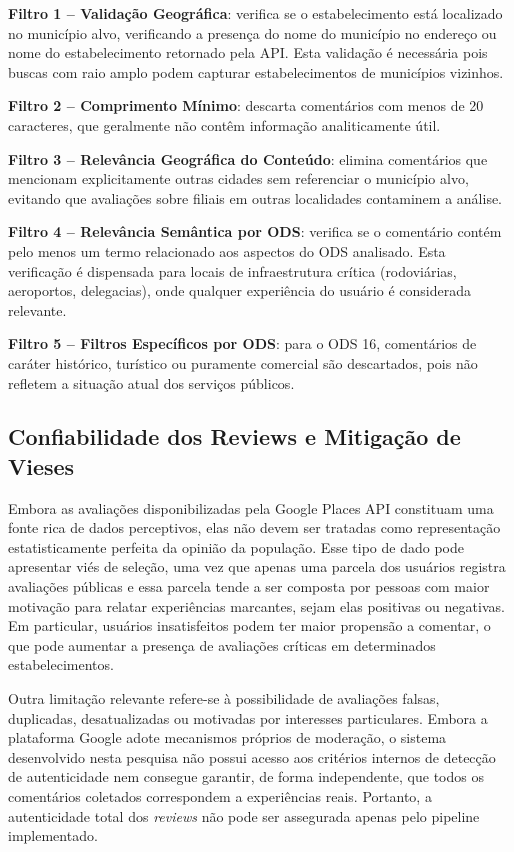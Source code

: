 \textbf{Filtro 1 -- Validação Geográfica}: verifica se o estabelecimento está localizado no município alvo, verificando a presença do nome do município no endereço ou nome do estabelecimento retornado pela API. Esta validação é necessária pois buscas com raio amplo podem capturar estabelecimentos de municípios vizinhos.

\textbf{Filtro 2 -- Comprimento Mínimo}: descarta comentários com menos de 20 caracteres, que geralmente não contêm informação analiticamente útil.

\textbf{Filtro 3 -- Relevância Geográfica do Conteúdo}: elimina comentários que mencionam explicitamente outras cidades sem referenciar o município alvo, evitando que avaliações sobre filiais em outras localidades contaminem a análise.

\textbf{Filtro 4 -- Relevância Semântica por ODS}: verifica se o comentário contém pelo menos um termo relacionado aos aspectos do ODS analisado. Esta verificação é dispensada para locais de infraestrutura crítica (rodoviárias, aeroportos, delegacias), onde qualquer experiência do usuário é considerada relevante.

\textbf{Filtro 5 -- Filtros Específicos por ODS}: para o ODS 16, comentários de caráter histórico, turístico ou puramente comercial são descartados, pois não refletem a situação atual dos serviços públicos.

\subsection{Confiabilidade dos Reviews e Mitigação de Vieses}
\label{subsec:confiabilidade-reviews}

Embora as avaliações disponibilizadas pela Google Places API constituam uma fonte rica de dados perceptivos, elas não devem ser tratadas como representação estatisticamente perfeita da opinião da população. Esse tipo de dado pode apresentar viés de seleção, uma vez que apenas uma parcela dos usuários registra avaliações públicas e essa parcela tende a ser composta por pessoas com maior motivação para relatar experiências marcantes, sejam elas positivas ou negativas. Em particular, usuários insatisfeitos podem ter maior propensão a comentar, o que pode aumentar a presença de avaliações críticas em determinados estabelecimentos.

Outra limitação relevante refere-se à possibilidade de avaliações falsas, duplicadas, desatualizadas ou motivadas por interesses particulares. Embora a plataforma Google adote mecanismos próprios de moderação, o sistema desenvolvido nesta pesquisa não possui acesso aos critérios internos de detecção de autenticidade nem consegue garantir, de forma independente, que todos os comentários coletados correspondem a experiências reais. Portanto, a autenticidade total dos \textit{reviews} não pode ser assegurada apenas pelo pipeline implementado.

